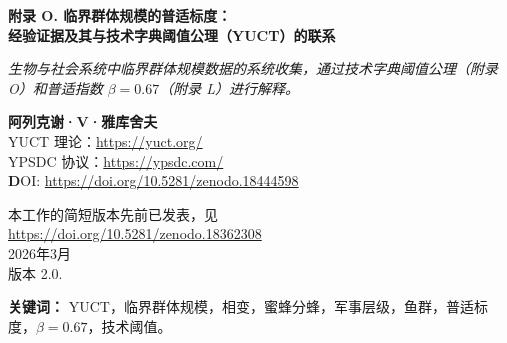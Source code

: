 \documentclass[12pt]{article}
\theoremstyle{remark}
\begin{document}
	
	\begin{titlepage}
		\begin{center}
			\vspace*{0.5cm}
			\Huge\textbf{附录 O. 临界群体规模的普适标度：\\ 经验证据及其与技术字典阈值公理（YUCT）的联系}
			
			\vspace{0.3cm}
			\small\textit{生物与社会系统中临界群体规模数据的系统收集，通过技术字典阈值公理（附录 O）和普适指数 $\beta = 0.67$（附录 L）进行解释。}
			
			\vspace{0.3cm}
			\small\textbf{阿列克谢·V·雅库舍夫} \\
			YUCT 理论：\url{https://yuct.org/}\\
			YPSDC 协议：\url{https://ypsdc.com/}\\
			
			\vspace{2cm}
			\textbf DOI: \url{https://doi.org/10.5281/zenodo.18444598}\\
			
			\vspace{1cm}
			
			\vspace{0cm}
			\large 
			本工作的简短版本先前已发表，见\\ \url{https://doi.org/10.5281/zenodo.18362308}\\
			\vspace{1cm}
			2026年3月 \\ \large 版本 2.0.
			
			\vspace{0.5cm}
			\begin{minipage}{0.95\textwidth}
				\begin{abstract}
					\noindent
					本附录汇集了各种集体系统发生相变（如集群、分裂或结构重组）的临界规模的经验数据。研究的系统包括：蜜蜂蜂群、军事单位、鱼群、海豚群、牲畜种群和灵长类群体。利用普适误差标度律 $\varepsilon \propto N^{\beta}$ 且 $\beta = 0.67$（附录 L）以及技术字典阈值公理（附录 O），我们推导出了发生相变的临界规模 $N_{\text{crit}}$ 与最优群体规模 $N_{\text{opt}}$ 之间的定量关系。不同系统观测到的比值 $N_{\text{crit}}/N_{\text{opt}}$ 均聚集在与 $\beta = 0.67$ 一致的值附近，这为该指数的普适性以及跨越技术（或组织）阈值对应于协调效率相变的观点提供了独立支持。我们还提出了具体的、可检验的预测，用于未来的实验和实地研究，从而进一步验证 YUCT 框架。
				\end{abstract}
			\end{minipage}
			
			\vspace{0.3cm}
			\noindent
			\small\textbf{关键词：} YUCT，临界群体规模，相变，蜜蜂分蜂，军事层级，鱼群，普适标度，$\beta = 0.67$，技术阈值。
		\end{center}
	\end{titlepage}
	
\end{document}

